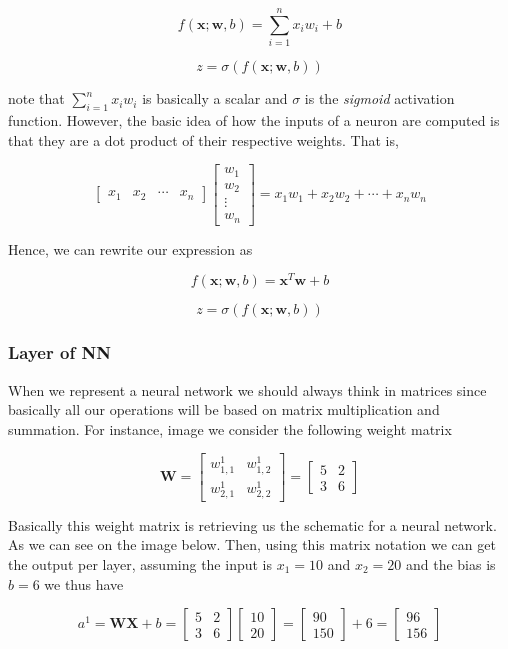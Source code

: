 \documentclass[a4paper,10pt]{article}
\begin{document}
$$
    f(\bm{x}; \bm{w}, b) = \sum^n_{i=1}x_i w_i + b
$$

$$
    z = \sigma( f(\bm{x}; \bm{w}, b) )
$$

\noindent note that $\sum^n_{i=1}x_i w_i$ is basically a scalar and $\sigma$ is the \textit{sigmoid} activation function. However, the basic idea of how the inputs of a neuron are computed is that they are a dot product of their respective weights. That is,

$$
\begin{bmatrix}
    x_1 & x_2 & \cdots & x_n
\end{bmatrix}\begin{bmatrix}
    w_1 \\
    w_2 \\
    \vdots\\
    w_n
\end{bmatrix} = x_1 w_1 + x_2 w_2 + \cdots + x_n w_n
$$


Hence, we can rewrite our expression as 

$$
    f(\bm{x}; \bm{w}, b) = \bm{x}^T \bm{w} + b
$$

$$
    z = \sigma(f(\bm{x}; \bm{w}, b))
$$

\subsubsection{Layer of NN}

When we represent a neural network we should always think in matrices since basically all our operations will be based on matrix multiplication and summation. For instance, image we consider the following weight matrix

$$
\bm{W} = \begin{bmatrix}
    w^1_{1, 1} & w^1_{1, 2}\\
    w^1_{2, 1} & w^1_{2, 2}
\end{bmatrix} = \begin{bmatrix}
    5 & 2\\
    3 & 6
\end{bmatrix}
$$

Basically this weight matrix is retrieving us the schematic for a neural network. As we can see on the image below. 
Then, using this matrix notation we can get the output per layer, assuming the input is $x_1 = 10$ and $x_2 = 20$ and the bias is $b = 6$ we thus have 

$$
a^1 = \bm{W}\bm{X} + b = \begin{bmatrix}
    5 & 2\\
    3 & 6
\end{bmatrix} \begin{bmatrix}
    10 \\
    20
\end{bmatrix} = \begin{bmatrix}
    90 \\
    150
\end{bmatrix} + 6 = \begin{bmatrix}
    96 \\
    156
\end{bmatrix}
$$
\end{document}

